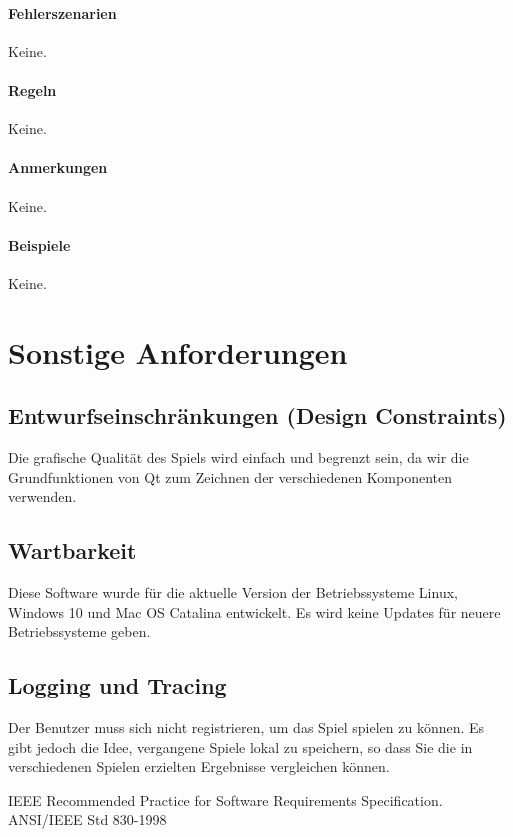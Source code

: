 \documentclass[a4paper, twosided, 11pt]{scrartcl}
\begin{document}
\paragraph{Fehlerszenarien} Keine.
\paragraph{Regeln} Keine.
\paragraph{Anmerkungen} Keine.
\paragraph{Beispiele} Keine.

\section{Sonstige Anforderungen}

\subsection{Entwurfseinschränkungen (Design Constraints)} Die grafische Qualität
des Spiels wird einfach und begrenzt sein, da wir die Grundfunktionen von Qt
zum Zeichnen der verschiedenen Komponenten verwenden.

\subsection{Wartbarkeit} Diese Software wurde für die aktuelle Version der
Betriebssysteme Linux, Windows 10 und Mac OS Catalina entwickelt. Es wird keine
Updates für neuere Betriebssysteme geben.

\subsection{Logging und Tracing} Der Benutzer muss sich nicht registrieren, um
das Spiel spielen zu können. Es gibt jedoch die Idee, vergangene Spiele lokal
zu speichern, so dass Sie die in verschiedenen Spielen erzielten Ergebnisse
vergleichen können.

\renewcommand{\refname}{Referenzen}
\begin{thebibliography}{2}
    IEEE Recommended Practice for Software Requirements Specification. ANSI/IEEE Std 830-1998
\end{thebibliography}
\end{document}
